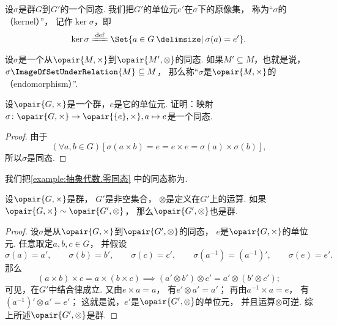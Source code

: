 \begin{definition}
设\(\sigma\)是群\(G\)到\(G'\)的一个同态.
我们把\(G'\)的单位元\(e'\)在\(\sigma\)下的原像集，
称为“\(\sigma\)的（kernel）”，
记作\(\ker\sigma\)，即\[
	\ker\sigma \defeq \Set{ a \in G \given \sigma(a) = e' }.
\]
\end{definition}

\begin{definition}
设\(\sigma\)是一个从\(\opair{M,\times}\)到\(\opair{M',\otimes}\)的同态.
如果\(M' \subseteq M\)，也就是说，\(\sigma\ImageOfSetUnderRelation{M}\subseteq M\)，
那么称“\(\sigma\)是\(\opair{M,\times}\)的（endomorphism）”.
\end{definition}

\begin{example}\label{example:抽象代数.零同态}
设\(\opair{G,\times}\)是一个群，\(e\)是它的单位元.
证明：映射\(\sigma\colon\opair{G,\times}\to\opair{\{e\},\times},a\mapsto e\)是一个同态.
\begin{proof}
由于\[
	(\forall a,b\in G)[
		\sigma(a \times b)
		= e
		= e \times e
		= \sigma(a) \times \sigma(b)
	],
\]
所以\(\sigma\)是同态.
\end{proof}
\end{example}
我们把\cref{example:抽象代数.零同态} 中的同态称为.

\begin{theorem}\label{theorem:抽象代数.群的同态象是群}
设\(\opair{G,\times}\)是群，
\(G'\)是非空集合，
\(\otimes\)是定义在\(G'\)上的运算.
如果\(\opair{G,\times}\sim\opair{G',\otimes}\)，
那么\(\opair{G',\otimes}\)也是群.
\begin{proof}
设\(\sigma\)是从\(\opair{G,\times}\)到\(\opair{G',\otimes}\)的同态，
\(e\)是\(\opair{G,\times}\)的单位元.
任意取定\(a,b,c\in G\)，
并假设\[
	\sigma(a)=a', \qquad
	\sigma(b)=b', \qquad
	\sigma(c)=c', \qquad
	\sigma(a^{-1})=(a^{-1})', \qquad
	\sigma(e)=e'.
\]
那么\[
	(a \times b)\times c = a \times(b \times c)
	\implies
	(a' \otimes b')\otimes c' = a' \otimes(b' \otimes c');
\]
可见，在\(G'\)中结合律成立.
又由\(e\times a=a\)，
有\(e'\otimes a'=a'\)；
再由\(a^{-1}\times a=e\)，
有\((a^{-1})'\otimes a'=e'\)；
这就是说，\(e'\)是\(\opair{G',\otimes}\)的单位元，
并且运算\(\otimes\)可逆.
综上所述\(\opair{G',\otimes}\)是群.
\end{proof}
\end{theorem}
